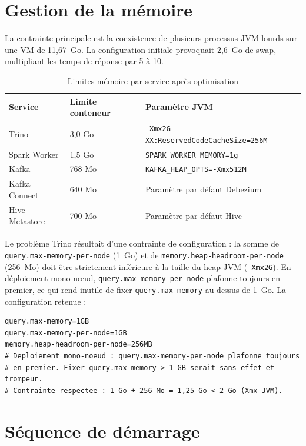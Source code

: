 \documentclass[12pt,a4paper]{report}
\begin{document}
\section{Gestion de la mémoire}

La contrainte principale est la coexistence de plusieurs processus JVM
lourds sur une VM de 11,67~Go. La configuration initiale provoquait
2,6~Go de swap, multipliant les temps de réponse par 5 à 10.

\begin{table}[h]
\centering
\caption{Limites mémoire par service après optimisation}
\label{tab:memory}
\renewcommand{\arraystretch}{1.3}
\begin{tabular}{lll}
\toprule
\textbf{Service} & \textbf{Limite conteneur} & \textbf{Paramètre JVM} \\
\midrule
Trino           & 3,0 Go  & \texttt{-Xmx2G -XX:ReservedCodeCacheSize=256M} \\
Spark Worker    & 1,5 Go  & \texttt{SPARK\_WORKER\_MEMORY=1g}               \\
Kafka           & 768 Mo  & \texttt{KAFKA\_HEAP\_OPTS=-Xmx512M}             \\
Kafka Connect   & 640 Mo  & Paramètre par défaut Debezium                  \\
Hive Metastore  & 700 Mo  & Paramètre par défaut Hive                      \\
\bottomrule
\end{tabular}
\end{table}

Le problème Trino résultait d'une contrainte de configuration : la somme de
\texttt{query.max-memory-per-node} (1~Go) et de
\texttt{memory.heap-headroom-per-node} (256~Mo) doit être strictement
inférieure à la taille du heap JVM (\texttt{-Xmx2G}). En déploiement
mono-nœud, \texttt{query.max-memory-per-node} plafonne toujours en premier,
ce qui rend inutile de fixer \texttt{query.max-memory} au-dessus de 1~Go.
La configuration retenue :

\begin{lstlisting}[caption={config/trino/config.properties --- limites mémoire}]
query.max-memory=1GB
query.max-memory-per-node=1GB
memory.heap-headroom-per-node=256MB
# Deploiement mono-noeud : query.max-memory-per-node plafonne toujours
# en premier. Fixer query.max-memory > 1 GB serait sans effet et trompeur.
# Contrainte respectee : 1 Go + 256 Mo = 1,25 Go < 2 Go (Xmx JVM).
\end{lstlisting}

\section{Séquence de démarrage}
\end{document}
